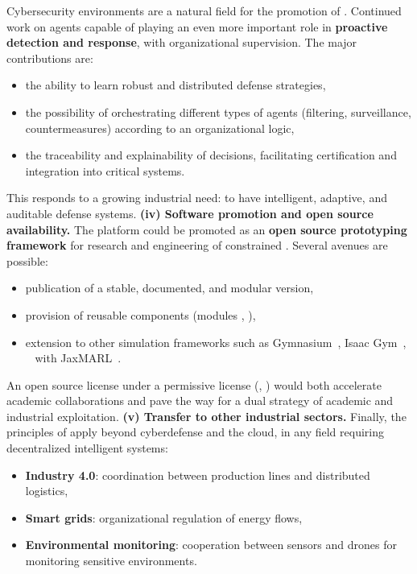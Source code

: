 Cybersecurity environments are a natural field for the promotion of .
Continued work on  agents capable of playing an even more important role in \textbf{proactive detection and response}, with organizational supervision.
The major contributions are:
\begin{itemize}
  \item the ability to learn robust and distributed defense strategies,
  \item the possibility of orchestrating different types of agents (filtering, surveillance, countermeasures) according to an organizational logic,
  \item the traceability and explainability of decisions, facilitating certification and integration into critical systems.
\end{itemize}
This responds to a growing industrial need: to have intelligent, adaptive, and auditable defense systems.
\medskip
\noindent
\textbf{(iv) Software promotion and open source availability.}
The  platform could be promoted as an \textbf{open source prototyping framework} for research and engineering of constrained .
Several avenues are possible:
\begin{itemize}
  \item publication of a stable, documented, and modular version,
  \item provision of reusable components (modules , ),
  \item extension to other simulation frameworks such as Gymnasium~\cite{kwiatkowski2024}, Isaac Gym~\cite{Makoviychuk2021}, ~\cite{Frostig2019} with JaxMARL~\cite{Rutherford2024}.
\end{itemize}
An open source license under a permissive license (, ) would both accelerate academic collaborations and pave the way for a dual strategy of academic and industrial exploitation.
\medskip
\noindent
\textbf{(v) Transfer to other industrial sectors.}
Finally, the principles of  apply beyond cyberdefense and the cloud, in any field requiring decentralized intelligent systems:
\begin{itemize}

  \item \textbf{Industry 4.0}: coordination between production lines and distributed logistics,
  \item \textbf{Smart grids}: organizational regulation of energy flows,
  \item \textbf{Environmental monitoring}: cooperation between sensors and drones for monitoring sensitive environments.
\end{itemize}

